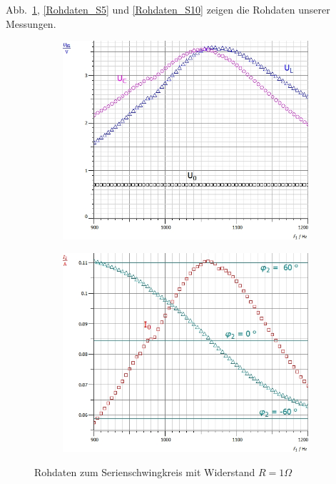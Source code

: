 \documentclass[12pt,a4paper]{article}
\begin{document}
Abb.~\ref{Rohdaten_S1}, \ref{Rohdaten_S5} und \ref{Rohdaten_S10} zeigen die Rohdaten unserer Messungen.
\begin{figure}[H]
	\centering
	\begin{subfigure}{0.49\textwidth}
		\centering
		\includegraphics[width=\textwidth]{Daten/S1_Rohdaten_U.jpg}
	\end{subfigure}
	\begin{subfigure}{0.49\textwidth}
		\centering
		\includegraphics[width=\textwidth]{Daten/S1_Rohdaten_I.jpg}
	\end{subfigure}
	\caption{Rohdaten zum Serienschwingkreis mit Widerstand $R=1\Omega$}
	\label{Rohdaten_S1}
\end{figure}
\end{document}
